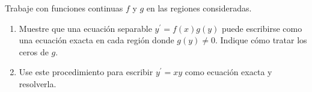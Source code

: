 Trabaje con funciones continuas $f$ y $g$ en las regiones consideradas.

\begin{enumerate}[label=(\alph*),ref=\alph*,leftmargin=*]
\item Muestre que una ecuación separable $y^{\prime}=f(x)g(y)$ puede escribirse como una ecuación exacta en cada región donde $g(y)\ne0$. Indique cómo tratar los ceros de $g$.
\item Use este procedimiento para escribir $y^{\prime}=xy$ como ecuación exacta y resolverla.
\end{enumerate}
